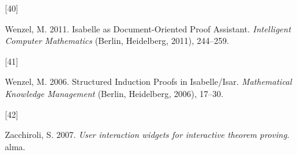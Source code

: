 \documentclass[
]{article}
\newlength{\cslhangindent}
\newlength{\csllabelwidth}
\newlength{\cslentryspacingunit} %
\newenvironment{CSLReferences}[2] %
 {%
  \setlength{\parindent}{0pt}
  \ifodd #1
  \let\oldpar\par
  \def\par{\hangindent=\cslhangindent\oldpar}
  \fi
  \setlength{\parskip}{#2\cslentryspacingunit}
 }%
 {}
\newcommand{\CSLLeftMargin}[1]{\parbox[t]{\csllabelwidth}{#1}}
\newcommand{\CSLRightInline}[1]{\parbox[t]{\linewidth - \csllabelwidth}{#1}\break}
\begin{document}
\begin{CSLReferences}{0}{0}
\leavevmode{}%
\CSLLeftMargin{{[}40{]} }
\CSLRightInline{Wenzel, M. 2011. Isabelle as {Document}-{Oriented}
{Proof} {Assistant}. \emph{Intelligent {Computer} {Mathematics}}
(Berlin, Heidelberg, 2011), 244--259.}

\leavevmode{}%
\CSLLeftMargin{{[}41{]} }
\CSLRightInline{Wenzel, M. 2006. Structured {Induction} {Proofs} in
{Isabelle}/{Isar}. \emph{Mathematical {Knowledge} {Management}} (Berlin,
Heidelberg, 2006), 17--30.}

\leavevmode{}%
\CSLLeftMargin{{[}42{]} }
\CSLRightInline{Zacchiroli, S. 2007. \emph{User interaction widgets for
interactive theorem proving}. alma.}

\end{CSLReferences}
\end{document}
